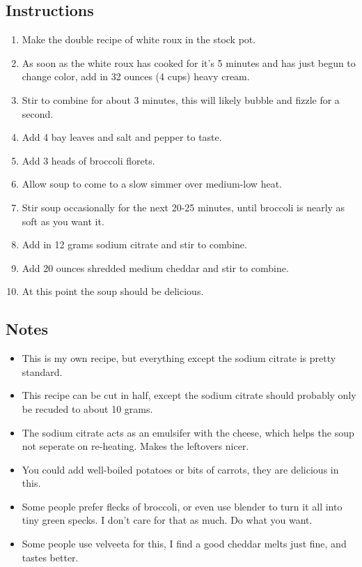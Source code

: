 \begin{multicols}{2}
\subsection*{Instructions}
\begin{enumerate}
    \item Make the double recipe of white roux in the stock pot.
    \item As soon as the white roux has cooked for it's 5 minutes and has just begun to change color, add in 32 ounces (4 cups) heavy cream.
    \item Stir to combine for about 3 minutes, this will likely bubble and fizzle for a second.
    \item Add 4 bay leaves and salt and pepper to taste.
    \item Add 3 heads of broccoli florets.
    \item Allow soup to come to a slow simmer over medium-low heat.
    \item Stir soup occasionally for the next 20-25 minutes, until broccoli is nearly as soft as you want it.
    \item Add in 12 grams sodium citrate and stir to combine.
    \item Add 20 ounces shredded medium cheddar and stir to combine.
    \item At this point the soup should be delicious.
\end{enumerate}

\subsection*{Notes}
\begin{itemize}
    \item This is my own recipe, but everything except the sodium citrate is pretty standard.
    \item This recipe can be cut in half, except the sodium citrate should probably only be recuded to about 10 grams.
    \item The sodium citrate acts as an emulsifer with the cheese, which helps the soup not seperate on re-heating. Makes the leftovers nicer.
    \item You could add well-boiled potatoes or bits of carrots, they are delicious in this.
    \item Some people prefer flecks of broccoli, or even use blender to turn it all into tiny green specks. I don't care for that as much. Do what you want.
    \item Some people use velveeta for this, I find a good cheddar melts just fine, and tastes better.
\end{itemize}
\end{multicols}
\clearpage